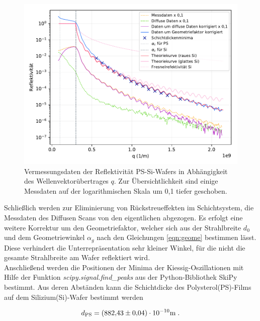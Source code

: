 \begin{figure}[H]
    \centering
    \includegraphics[scale=0.7]{content/plot4.pdf}
    \vspace{-10pt}
    \caption{Vermessungsdaten der Reflektivität PS-Si-Wafers in Abhängigkeit des Wellenvektorübertrages $q$.
            Zur Übersichtlichkeit sind einige Messdaten auf der logarithmischen Skala um 0,1 tiefer geschoben.}
    \label{fig:plot4}
\end{figure}

Schließlich werden zur Eliminierung von Rückstreueffekten im Schichtsystem, die Messdaten des Diffusen Scans
von den eigentlichen abgezogen.
Es erfolgt eine weitere Korrektur um den Geometriefaktor, welcher sich aus der Strahlbreite $d_0$ und dem 
Geometriewinkel $\alpha_g$ nach den Gleichungen \eqref{eqn:geome} bestimmen lässt. 
Diese verhindert die Unterrepräsentation sehr kleiner Winkel, für die nicht die gesamte Strahlbreite am Wafer 
reflektiert wird.\\

Anschließend werden die Positionen der Minima der Kiessig-Oszillationen mit Hilfe der Funktion
\textit{scipy.signal.find\_peaks} aus der Python-Bibliothek SkiPy bestimmt.
Aus deren Abständen kann die Schichtdicke des Polysterol(PS)-Films auf dem Silizium(Si)-Wafer bestimmt werden

\vspace{-20pt}
\begin{equation*}
    d_\text{PS} = (\num{882.43 +- 0.04}) \cdot 10^{-10} \si{\meter} \; .
\end{equation*}

